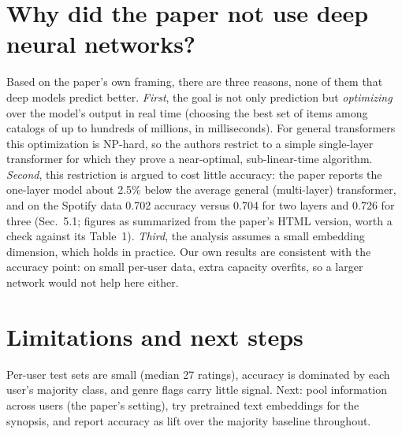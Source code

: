 \documentclass[11pt]{article}
\begin{document}
\section{Why did the paper not use deep neural networks?}
Based on the paper's own framing, there are three reasons, none of them that deep models predict better.
\emph{First}, the goal is not only prediction but \emph{optimizing} over the model's output in real time (choosing
the best set of items among catalogs of up to hundreds of millions, in milliseconds). For general transformers this
optimization is NP-hard, so the authors restrict to a simple single-layer transformer for which they prove a
near-optimal, sub-linear-time algorithm. \emph{Second}, this restriction is argued to cost little accuracy: the
paper reports the one-layer model about 2.5\% below the average general (multi-layer) transformer, and on the Spotify data
0.702 accuracy versus 0.704 for two layers and 0.726 for three (Sec.~5.1; figures as summarized from the paper's HTML
version, worth a check against its Table~1). \emph{Third}, the analysis assumes a small embedding dimension, which holds in practice. Our own results are
consistent with the accuracy point: on small per-user data, extra capacity overfits, so a larger network would
not help here either.

\section{Limitations and next steps}
Per-user test sets are small (median 27 ratings), accuracy is dominated by each user's majority class, and genre
flags carry little signal. Next: pool information across users (the paper's setting), try pretrained text embeddings for the synopsis, and report accuracy as lift over the majority baseline throughout.
\end{document}
